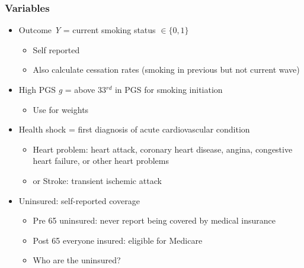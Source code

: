 \documentclass[10pt,compress,xcolor=dvipsnames,aspectratio=169]{beamer}    %
\newcounter{ex}
\newcommand{\1}[1]{\mathrm{1\hspace*{-2.5pt}l}[#1]}	%
\begin{document}
\begin{frame}\frametitle{Variables} \label{frame:vars}

\begin{itemize}
	\item Outcome \textit{\color{Verde} Y} = current smoking status $\in \{0,1\}$
	\begin{itemize}
		\item Self reported
		\item Also calculate cessation rates (smoking in previous but not current wave)
	\end{itemize}

	\smallskip

	\item High PGS \textit{\color{Verde} g} = above 33$^{rd}$ in PGS for smoking initiation
	\begin{itemize}
		\item Use \cite{GSCAN2019gwas} for weights
	\end{itemize}

	\smallskip

	\item Health {\color{Verde} shock} = first diagnosis of acute cardiovascular condition
	\begin{itemize}
		\item Heart problem: heart attack, coronary heart disease, angina, congestive heart
failure, or other heart problems
		\item or Stroke: transient ischemic attack
	\end{itemize}

	\smallskip

	\item {\color{Verde} Uninsured}: self-reported coverage
	\begin{itemize}
		\item Pre 65 uninsured: never report being covered by medical insurance
		\item Post 65 everyone insured: eligible for Medicare
		\item Who are the uninsured? \hyperlink{frame:uninsured}{\beamergotobutton{}}
	\end{itemize}
\end{itemize}

\end{frame}
\end{document}
